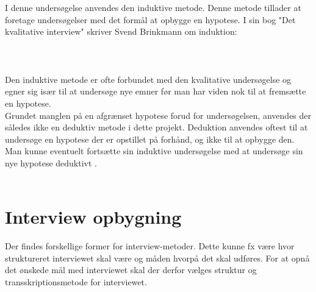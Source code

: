 \\
\\ 
I denne undersøgelse anvendes den induktive metode. Denne metode tillader at foretage undersøgelser med det formål at opbygge en hypotese. 
I sin bog "Det kvalitative interview" skriver Svend Brinkmann om induktion:
\\
\\
 \citep{brinkmann2014}
\\
\\
Den induktive metode er ofte forbundet med den kvalitative undersøgelse og egner sig især til at undersøge nye emner før man har viden nok til at fremsætte en hypotese. 
\\
Grundet manglen på en afgrænset hypotese forud for undersøgelsen, anvendes der således ikke en deduktiv metode i dette projekt. Deduktion anvendes oftest til at undersøge en hypotese der er opstillet på forhånd, og ikke til at opbygge den. Man kunne eventuelt fortsætte sin induktive undersøgelse med at undersøge sin nye hypotese deduktivt \cite{deduktiv}.
\\
\\



\section{Interview opbygning}
Der findes forskellige former for interview-metoder. Dette kunne fx være hvor struktureret interviewet skal være og måden hvorpå det skal udføres. For at opnå det ønskede mål med interviewet skal der derfor vælges struktur og transskriptionsmetode for interviewet.

